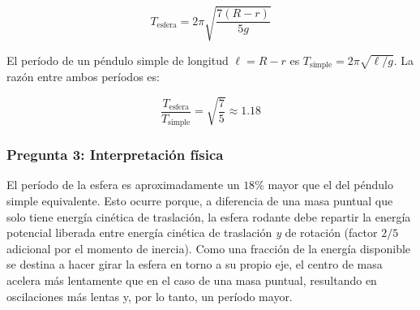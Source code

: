 \begin{sol}
$$\boxed{T_{\text{esfera}} = 2\pi\sqrt{\frac{7(R-r)}{5g}}}$$

El período de un péndulo simple de longitud $\ell = R-r$ es $T_{\text{simple}} = 2\pi\sqrt{\ell/g}$. La razón entre ambos períodos es:

$$\frac{T_{\text{esfera}}}{T_{\text{simple}}} = \sqrt{\frac{7}{5}} \approx 1.18$$

\subsubsection*{Pregunta 3: Interpretación física}

El período de la esfera es aproximadamente un $18\%$ mayor que el del péndulo simple equivalente. Esto ocurre porque, a diferencia de una masa puntual que solo tiene energía cinética de traslación, la esfera rodante debe repartir la energía potencial liberada entre energía cinética de traslación \emph{y} de rotación (factor $2/5$ adicional por el momento de inercia). Como una fracción de la energía disponible se destina a hacer girar la esfera en torno a su propio eje, el centro de masa acelera más lentamente que en el caso de una masa puntual, resultando en oscilaciones más lentas y, por lo tanto, un período mayor.

\end{sol}
